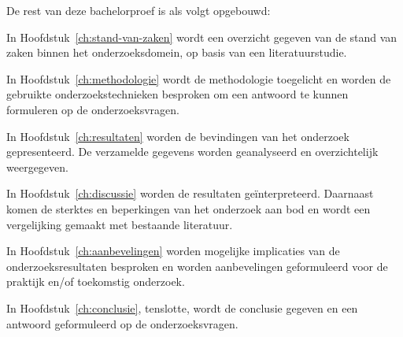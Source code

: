 De rest van deze bachelorproef is als volgt opgebouwd:

In Hoofdstuk~\ref{ch:stand-van-zaken} wordt een overzicht gegeven van de stand van zaken binnen het onderzoeksdomein, op basis van een literatuurstudie.

In Hoofdstuk~\ref{ch:methodologie} wordt de methodologie toegelicht en worden de gebruikte onderzoekstechnieken besproken om een antwoord te kunnen formuleren op de onderzoeksvragen.

In Hoofdstuk~\ref{ch:resultaten} worden de bevindingen van het onderzoek gepresenteerd. De verzamelde gegevens worden geanalyseerd en overzichtelijk weergegeven.

In Hoofdstuk~\ref{ch:discussie} worden de resultaten geïnterpreteerd. Daarnaast komen de sterktes en beperkingen van het onderzoek aan bod en wordt een vergelijking gemaakt met bestaande literatuur.

In Hoofdstuk~\ref{ch:aanbevelingen} worden mogelijke implicaties van de onderzoeksresultaten besproken en worden aanbevelingen geformuleerd voor de praktijk en/of toekomstig onderzoek.

In Hoofdstuk~\ref{ch:conclusie}, tenslotte, wordt de conclusie gegeven en een antwoord geformuleerd op de onderzoeksvragen.